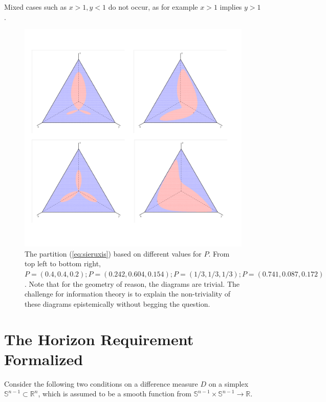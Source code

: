 \documentclass[phd,12pt,oneside]{ubcthesis}
\begin{document}
{\noindent}Mixed cases such as $x>1,y<1$ do not occur, as for example $x>1$
implies $y>1$.

\begin{figure}[ht!]
    \begin{minipage}[h]{\linewidth}
      \includegraphics[width=\textwidth]{concat2.png}
      \caption{\footnotesize The partition (\ref{eq:sieruxis}) based
        on different values for $P$. From top left to bottom right,
        $P=(0.4,0.4,0.2); P=(0.242,0.604,0.154); P=(1/3,1/3,1/3);
        P=(0.741,0.087,0.172)$.
        Note that for the geometry of reason, the diagrams are
        trivial. The challenge for information theory is to explain
        the non-triviality of these diagrams epistemically without
        begging the question.}
      \label{fig:concat}
    \end{minipage}
\end{figure}

\chapter{The Horizon Requirement Formalized}
\label{app:horform}

Consider the following two conditions on a difference measure $D$ on a
simplex $\mathbb{S}^{n-1}\subset{}\mathbb{R}^{n}$, which is assumed to
be a smooth function from
$\mathbb{S}^{n-1}\times\mathbb{S}^{n-1}\rightarrow{}\mathbb{R}$.
\end{document}

